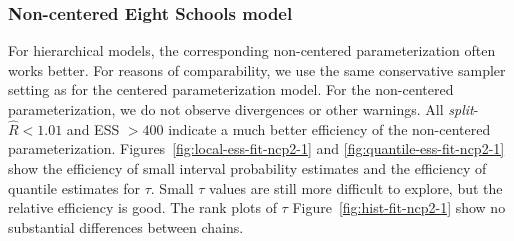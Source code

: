 \documentclass[american,]{article}
\begin{document}
\hypertarget{non-centered-eight-schools-model}{%
\subsubsection{Non-centered Eight Schools
model}\label{non-centered-eight-schools-model}}

For hierarchical models, the corresponding non-centered
parameterization often works better. For reasons of comparability, we use the same conservative sampler setting as for the centered parameterization model. 
For the non-centered parameterization, we do not observe divergences or 
other warnings.
All \emph{split}-\(\widehat{R}<1.01\) and ESS \(>400\) indicate a much
better efficiency of the non-centered parameterization.
Figures~\ref{fig:local-ess-fit-ncp2-1} and
\ref{fig:quantile-ess-fit-ncp2-1} show the efficiency of small interval
probability estimates and the efficiency of quantile estimates for
$\tau$.
Small $\tau$ values are still more difficult to explore, but the relative 
efficiency is good. The rank plots of $\tau$ Figure~\ref{fig:hist-fit-ncp2-1} 
show no substantial differences between chains.
\end{document}
